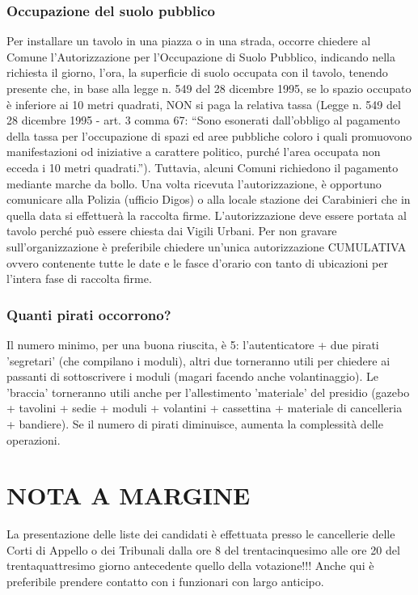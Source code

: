 \documentclass[paper=a4,11pt]{scrartcl}
\begin{document}
\subsubsection{Occupazione del suolo pubblico}
Per installare un tavolo in una piazza o in una strada, occorre chiedere al 
Comune l'Autorizzazione per l'Occupazione di Suolo Pubblico, indicando nella 
richiesta il giorno, l'ora, la superficie di suolo occupata con il tavolo, 
tenendo presente che, in base alla legge n. 549 del 28 dicembre 1995, se lo
spazio occupato è inferiore ai 10 metri quadrati, NON si paga la relativa 
tassa (Legge n. 549 del 28 dicembre 1995 - art. 3 comma 67: ``Sono esonerati 
dall'obbligo al pagamento della tassa per l'occupazione di spazi ed aree 
pubbliche coloro i quali promuovono manifestazioni od iniziative a carattere 
politico, purché l'area occupata non ecceda i 10 metri quadrati.'').
 Tuttavia, alcuni Comuni richiedono il pagamento mediante marche da bollo.
Una volta ricevuta l’autorizzazione, è opportuno comunicare alla Polizia 
(ufficio Digos) o alla locale stazione dei Carabinieri che in quella data si 
effettuerà la raccolta firme. L'autorizzazione deve essere portata al tavolo 
perché può essere chiesta dai Vigili Urbani. Per non gravare sull'organizzazione 
è preferibile chiedere un'unica autorizzazione CUMULATIVA ovvero contenente 
tutte le date e le fasce d'orario con tanto di ubicazioni per l'intera fase di 
raccolta firme.

\subsubsection{Quanti pirati occorrono?}
Il numero minimo, per una buona riuscita, è 5: l'autenticatore + due pirati 
'segretari' (che compilano i moduli), altri due torneranno utili per chiedere 
ai passanti di sottoscrivere i moduli (magari facendo anche volantinaggio). Le 
'braccia' torneranno utili anche per l'allestimento 'materiale' del presidio 
(gazebo + tavolini + sedie + moduli + volantini + cassettina + materiale di 
cancelleria + bandiere). Se il numero di pirati diminuisce, aumenta la 
complessità delle operazioni. 

\section{NOTA A MARGINE}
La presentazione delle liste dei candidati è effettuata presso le cancellerie 
delle Corti di Appello o dei Tribunali dalla ore 8 del trentacinquesimo alle 
ore 20 del trentaquattresimo giorno antecedente quello della votazione!!! Anche 
qui è preferibile prendere contatto con i funzionari con largo anticipo.
\end{document}

